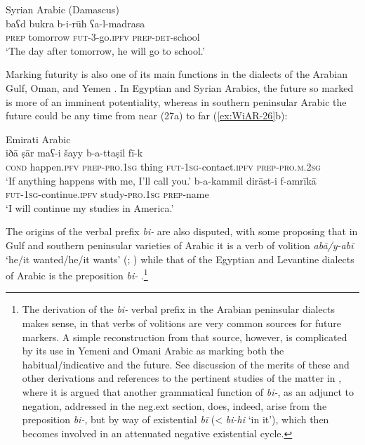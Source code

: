 \documentclass[output=paper]{langsci/langscibook}
\begin{document}
\ea Syrian Arabic (Damascus)\label{ex:WiAR-25}\\
	\gll baʕd bukra b-i-rūħ ʕa-l-madrasa\\
	\textsc{prep} tomorrow \textsc{fut}-3-go.\textsc{ipfv} \textsc{prep-det}-school\\
	\glt ‘The day after tomorrow, he will go to school.’ \citep[324]{cowell2005a}
\z

Marking futurity is also one of its main functions in the dialects of the Arabian Gulf, Oman, and Yemen \citep{persson2008a, retsoe2011a, retsoe2014a}. In Egyptian and Syrian Arabics, the future so marked is more of an imminent potentiality, whereas in southern peninsular Arabic the future could be any time from near (27a) to far (\ref{ex:WiAR-26}b):

\ea Emirati Arabic\label{ex:WiAR-26}\\
  \ea
  	\gll iðā ṣār maʕ-i šayy b-a-ttaṣil fī-k\\
  	\textsc{cond} happen.\textsc{pfv} \textsc{prep-pro.1sg} thing \textsc{fut-1sg}-contact.\textsc{ipfv} \textsc{prep-pro.m.2sg}\\
  	\glt ‘If anything happens with me, I’ll call you.’ \citep[750]{jarad2017a}
  \ex
  	\gll b-a-kammil dirāst-i f-amrīkā\\
  	\textsc{fut-1sg}-continue.\textsc{ipfv} study-\textsc{pro.1sg} \textsc{prep}-name\\
  	\glt ‘I will continue my studies in America.’ \citep[751]{jarad2017a}
\z \z

The origins of the verbal prefix \textit{bi-} are also disputed, with some proposing that in Gulf and southern peninsular varieties of Arabic it is a verb of volition \textit{abā/y-abī} ‘he/it wanted/he/it wants’ (\citealp[67]{retsoe2014a}; \citealp[217-219]{owens2018a}) while that of the Egyptian and Levantine dialects of Arabic is the preposition \textit{bi-} \citep[66, 70]{retsoe2014a}.\footnote{The derivation of the \textit{bi-} verbal prefix in the Arabian peninsular dialects makes sense, in that verbs of volitions are very common sources for future markers. A simple reconstruction from that source, however, is complicated by its use in Yemeni and Omani Arabic as marking both the habitual/indicative and the future. See discussion of the merits of these and other derivations and references to the pertinent studies of the matter in \citet{wilmsen2020b}, where it is argued that another grammatical function of \textit{bi-}, as an adjunct to negation, addressed in the neg.ext section, does, indeed, arise from the preposition \textit{bi-}, but by way of existential \textit{bī} (< \textit{bi-hi} ‘in it’), which then becomes involved in an attenuated negative existential cycle.}
\end{document}
